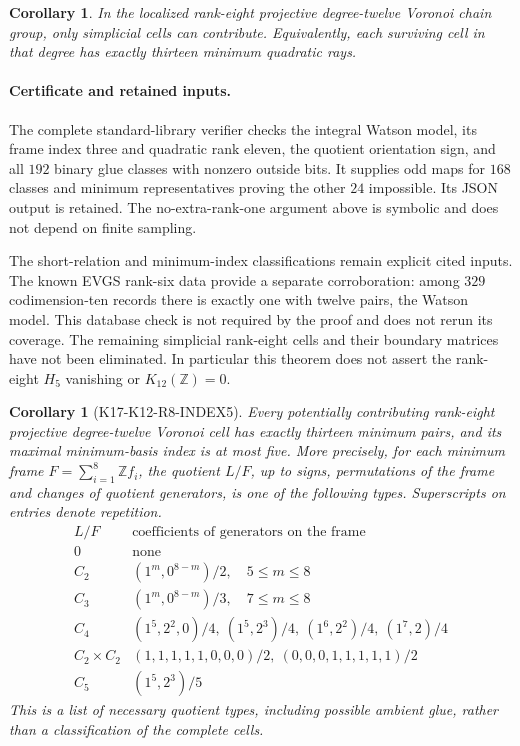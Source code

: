 \documentclass[11pt,a4paper]{article}
\newtheorem{corollary}[theorem]{Corollary}
\theoremstyle{definition}
\begin{document}
\begin{corollary}
\label{cor:k12-r8-simplicial-gate}
In the localized rank-eight projective degree-twelve Voronoi
chain group, only simplicial cells can contribute. Equivalently,
each surviving cell in that degree has exactly thirteen minimum
quadratic rays.
\end{corollary}

\paragraph{Certificate and retained inputs.}
The complete standard-library verifier
 checks the integral
Watson model, its frame index three and quadratic rank eleven,
the quotient orientation sign, and all $192$ binary glue classes
with nonzero outside bits. It supplies odd maps for $168$ classes
and minimum representatives proving the other $24$ impossible.
Its JSON output is retained. The no-extra-rank-one argument above
is symbolic and does not depend on finite sampling.

The short-relation and minimum-index classifications remain
explicit cited inputs. The known EVGS rank-six data provide a
separate corroboration: among $329$ codimension-ten records there
is exactly one with twelve pairs, the Watson model. This database
check is not required by the proof and does not rerun its coverage.
The remaining simplicial rank-eight cells and their boundary
matrices have not been eliminated. In particular this theorem
does not assert the rank-eight $H_5$ vanishing or
$K_{12}(\mathbb Z)=0$.

\begin{corollary}[K17-K12-R8-INDEX5]
\label{cor:k12-r8-index-five}
Every potentially contributing rank-eight projective degree-twelve
Voronoi cell has exactly thirteen minimum pairs, and its maximal
minimum-basis index is at most five. More precisely, for each minimum
frame $F=\sum_{i=1}^8\mathbb Zf_i$, the quotient $L/F$, up to signs,
permutations of the frame and changes of quotient generators, is one
of the following types. Superscripts on entries denote repetition.
\[
\begin{array}{c|l}
 L/F & \text{coefficients of generators on the frame}\\ \hline
 0 & \text{none}\\
 C_2 &(1^m,0^{8-m})/2,\quad 5\leq m\leq8\\
 C_3 &(1^m,0^{8-m})/3,\quad 7\leq m\leq8\\
 C_4 &(1^5,2^2,0)/4,\ (1^5,2^3)/4,\
       (1^6,2^2)/4,\ (1^7,2)/4\\
 C_2\times C_2 &(1,1,1,1,1,0,0,0)/2,\
                 (0,0,0,1,1,1,1,1)/2\\
 C_5 &(1^5,2^3)/5
\end{array}
\]
This is a list of necessary quotient types, including possible
ambient glue, rather than a classification of the complete cells.
\end{corollary}
\end{document}
